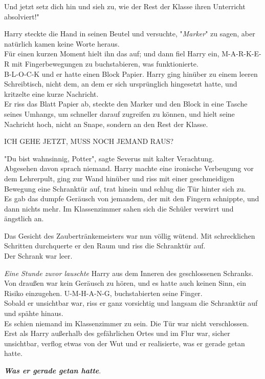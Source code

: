 {Und jetzt setz dich hin und sieh zu, wie der Rest der Klasse ihren Unterricht absolviert!"

Harry steckte die Hand in seinen Beutel und versuchte, "\emph{Marker}" zu sagen, aber natürlich kamen keine Worte heraus.\\ Für einen kurzen Moment hielt ihn das auf; und dann fiel Harry ein, M-A-R-K-E-R mit Fingerbewegungen zu buchstabieren, was funktionierte.\\ B-L-O-C-K und er hatte einen Block Papier. Harry ging hinüber zu einem leeren Schreibtisch, nicht dem, an dem er sich ursprünglich hingesetzt hatte, und kritzelte eine kurze Nachricht.\\ Er riss das Blatt Papier ab, steckte den Marker und den Block in eine Tasche seines Umhangs, um schneller darauf zugreifen zu können, und hielt seine Nachricht hoch, nicht an Snape, sondern an den Rest der Klasse.

ICH GEHE JETZT, MUSS NOCH JEMAND RAUS?

"Du bist wahnsinnig, Potter", sagte Severus mit kalter Verachtung.\\ Abgesehen davon sprach niemand. Harry machte eine ironische Verbeugung vor dem Lehrerpult, ging zur Wand hinüber und riss mit einer geschmeidigen Bewegung eine Schranktür auf, trat hinein und schlug die Tür hinter sich zu.\\ Es gab das dumpfe Geräusch von jemandem, der mit den Fingern schnippte, und dann nichts mehr. Im Klassenzimmer sahen sich die Schüler verwirrt und ängstlich an.

Das Gesicht des Zaubertränkemeisters war nun völlig wütend. Mit schrecklichen Schritten durchquerte er den Raum und riss die Schranktür auf.\\ Der Schrank war leer.

\emph{Eine Stunde zuvor lauschte} Harry aus dem Inneren des geschlossenen Schranks.\\ Von draußen war kein Geräusch zu hören, und es hatte auch keinen Sinn, ein Risiko einzugehen. U-M-H-A-N-G, buchstabierten seine Finger.\\ Sobald er unsichtbar war, riss er ganz vorsichtig und langsam die Schranktür auf und spähte hinaus.\\ Es schien niemand im Klassenzimmer zu sein. Die Tür war nicht verschlossen. Erst als Harry außerhalb des gefährlichen Ortes und im Flur war, sicher unsichtbar, verflog etwas von der Wut und er realisierte, was er gerade getan hatte.

\textbf{\emph{Was er gerade getan hatte}}.

}
